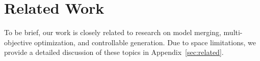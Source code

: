 \section{Related Work}
To be brief, our work is closely related to research on model merging, multi-objective optimization, and controllable generation. Due to space limitations, we provide a detailed discussion of these topics in Appendix~\ref{sec:related}.
